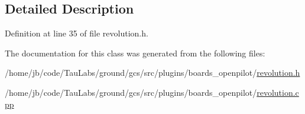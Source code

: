 \subsection{\-Detailed \-Description}


\-Definition at line 35 of file revolution.\-h.



\-The documentation for this class was generated from the following files\-:\begin{DoxyCompactItemize}
\item 
/home/jb/code/\-Tau\-Labs/ground/gcs/src/plugins/boards\-\_\-openpilot/\hyperlink{revolution_8h}{revolution.\-h}\item 
/home/jb/code/\-Tau\-Labs/ground/gcs/src/plugins/boards\-\_\-openpilot/\hyperlink{revolution_8cpp}{revolution.\-cpp}\end{DoxyCompactItemize}
